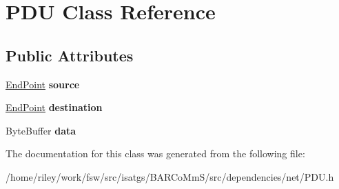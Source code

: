 \hypertarget{class_p_d_u}{}\section{P\+DU Class Reference}
\label{class_p_d_u}
\subsection*{Public Attributes}
\begin{DoxyCompactItemize}
\item 
\hyperlink{classisat__net_1_1_end_point}{End\+Point} {\bfseries source}\hypertarget{class_p_d_u_af2103f3da8de41d94a423b2e2f99fb4e}{}\label{class_p_d_u_af2103f3da8de41d94a423b2e2f99fb4e}

\item 
\hyperlink{classisat__net_1_1_end_point}{End\+Point} {\bfseries destination}\hypertarget{class_p_d_u_a7dbc2c8b12d0e1b6f7dae1dccde4f8d8}{}\label{class_p_d_u_a7dbc2c8b12d0e1b6f7dae1dccde4f8d8}

\item 
Byte\+Buffer {\bfseries data}\hypertarget{class_p_d_u_aed2fc032220544e55800cde2d58db0b2}{}\label{class_p_d_u_aed2fc032220544e55800cde2d58db0b2}

\end{DoxyCompactItemize}


The documentation for this class was generated from the following file\+:\begin{DoxyCompactItemize}
\item 
/home/riley/work/fsw/src/isatgs/\+B\+A\+R\+Co\+Mm\+S/src/dependencies/net/P\+D\+U.\+h\end{DoxyCompactItemize}
